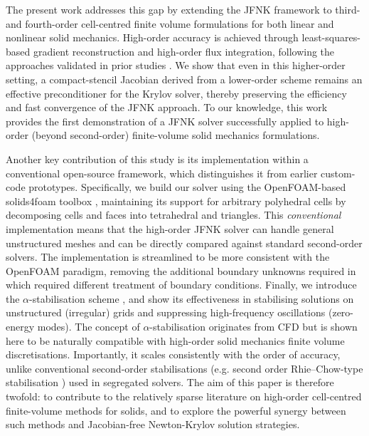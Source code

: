 \documentclass[sn-mathphys,Numbered]{sn-jnl}%
\begin{document}
The present work addresses this gap by extending the JFNK framework to third- and fourth-order cell-centred finite volume formulations for both linear and nonlinear solid mechanics. High-order accuracy is achieved through least-squares-based gradient reconstruction and high-order flux integration, following the approaches validated in prior studies \cite{Castrillo2022, Castrillo2024}. We show that even in this higher-order setting, a compact-stencil Jacobian derived from a lower-order scheme remains an effective preconditioner for the Krylov solver, thereby preserving the efficiency and fast convergence of the JFNK approach. To our knowledge, this work provides the first demonstration of a JFNK solver successfully applied to high-order (beyond second-order) finite-volume solid mechanics formulations.

Another key contribution of this study is its implementation within a conventional open-source framework, which distinguishes it from earlier custom-code prototypes.
Specifically, we build our solver using the OpenFOAM-based solids4foam toolbox \cite{Weller1998, Cardiff2025a}, maintaining its support for arbitrary polyhedral cells by decomposing cells and faces into tetrahedral and triangles.
This \emph{conventional} implementation means that the high-order JFNK solver can handle general unstructured meshes and can be directly compared against standard second-order solvers.
The implementation is streamlined to be more consistent with the OpenFOAM paradigm, removing the additional boundary unknowns required in \cite{Castrillo2022, Castrillo2024} which required different treatment of boundary conditions. Finally, we introduce the $\alpha$-stabilisation scheme \cite{Nishikawa2010, Nishikawa2011, Nishikawa2025a, Antoniadis2022}, and show its effectiveness in stabilising solutions on unstructured (irregular) grids and suppressing high-frequency oscillations (zero-energy modes). The concept of $\alpha$-stabilisation originates from CFD but is shown here to be naturally compatible with high-order solid mechanics finite volume discretisations. Importantly, it scales consistently with the order of accuracy, unlike conventional second-order stabilisations (e.g. second order Rhie–Chow-type stabilisation \cite{Cardiff2025a}) used in segregated solvers. The aim of this paper is therefore twofold: to contribute to the relatively sparse literature on high-order cell-centred finite-volume methods for solids, and to explore the powerful synergy between such methods and Jacobian-free Newton-Krylov solution strategies.
\end{document}
